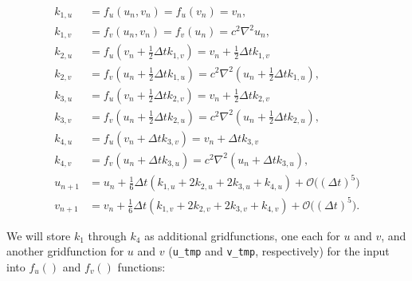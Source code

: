 \documentclass[landscape,letterpaper,10pt,english]{article}
\begin{document}
\begin{align}
k_{1,u} &= f_u(u_n,v_n) = f_u(v_n) = v_n, \\
k_{1,v} &= f_v(u_n,v_n) = f_v(u_n) = c^2\nabla^2 u_n, \\
k_{2,u} &= f_u\left(v_n + \frac{1}{2}\Delta tk_{1,v}\right) = v_n + \frac{1}{2}\Delta tk_{1,v}\\
k_{2,v} &= f_v\left(u_n + \frac{1}{2}\Delta tk_{1,u}\right) = c^2\nabla^2 \left(u_n + \frac{1}{2}\Delta tk_{1,u}\right), \\
k_{3,u} &= f_u\left(v_n + \frac{1}{2}\Delta tk_{2,v}\right) = v_n + \frac{1}{2}\Delta tk_{2,v}\\
k_{3,v} &= f_v\left(u_n + \frac{1}{2}\Delta tk_{2,u}\right) = c^2\nabla^2 \left(u_n + \frac{1}{2}\Delta tk_{2,u}\right), \\
k_{4,u} &= f_u(v_n + \Delta tk_{3,v}) = v_n + \Delta tk_{3,v}\\
k_{4,v} &= f_v(u_n + \Delta tk_{3,u}) = c^2\nabla^2 \left(u_n + \Delta tk_{3,u}\right), \\
u_{n+1} &= u_n + \frac{1}{6}\Delta t(k_{1,u} + 2k_{2,u} + 2k_{3,u} + k_{4,u}) + \mathcal{O}\big((\Delta t)^5\big)\\
v_{n+1} &= v_n + \frac{1}{6}\Delta t(k_{1,v} + 2k_{2,v} + 2k_{3,v} + k_{4,v}) + \mathcal{O}\big((\Delta t)^5\big).
\end{align}

We will store \(k_1\) through \(k_4\) as additional gridfunctions, one
each for \(u\) and \(v\), and another gridfunction for \(u\) and \(v\)
(\texttt{u\_tmp} and \texttt{v\_tmp}, respectively) for the input into
\(f_u()\) and \(f_v()\) functions:
\end{document}
